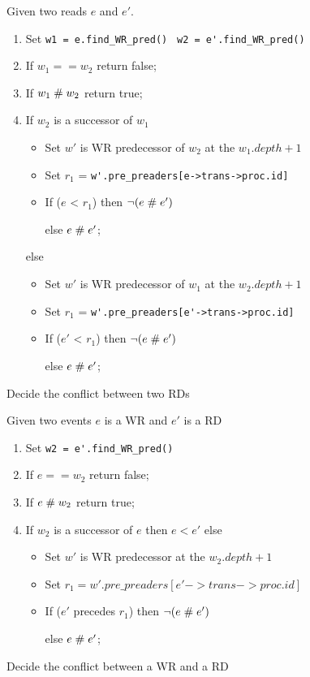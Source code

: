 \documentclass{llncs}
\begin{document}
\begin{algorithm}
Given two reads $e$ and $e'$.
\begin{enumerate}
	\item
		Set \verb!w1 = e.find_WR_pred() !
			\verb!w2 = e'.find_WR_pred()!
	\item
		If $w_1 == w_2$
			return false;
	\item
		If $w_1 \mathrel{\#} w_2$
			return true;
	\item
		If $w_2$ is a successor of $w_1$
		\begin{itemize}
			\item
				Set $w'$ is WR predecessor of $w_2$ at the $w_1.depth + 1$
			\item
				Set $r_1$ = \verb!w'.pre_preaders[e->trans->proc.id]!
			\item
				If ($e$ < $r_1$) then $\lnot (e \mathrel{\#} e')$
				
				else 	$e \mathrel{\#} e'$;
		\end{itemize}
		else
		\begin{itemize}
			\item
				Set $w'$ is WR predecessor of $w_1$ at the $w_2.depth + 1$
			\item
				Set $r_1$ = \verb!w'.pre_preaders[e'->trans->proc.id]!
			\item
				If ($e'$ < $r_1$) then $\lnot (e \mathrel{\#} e')$
				
				else 	$e \mathrel{\#} e'$;
		\end{itemize}
		
\end{enumerate}
\caption{Decide the conflict between two RDs}
\label{a:rds}	
\end{algorithm}

\begin{algorithm}
Given two events $e$ is a WR and $e'$ is a RD
\begin{enumerate}
	\item
		Set 	\verb!w2 = e'.find_WR_pred()!
	\item
		If $e == w_2$
			return false;
	\item
		If $e \mathrel{\#} w_2$
			return true;
	\item
		If $w_2$ is a successor of $e$
		then $e < e'$
		else
		\begin{itemize}
			\item
				Set $w'$ is WR predecessor at the $w_2.depth + 1$
			\item
				Set $r_1 = w'.pre\_preaders[e'->trans->proc.id]$
			\item
				If ($e'$ precedes $r_1$) then $\lnot (e \mathrel{\#} e')$
				
				else 	$e \mathrel{\#} e'$;
		\end{itemize}
		
\end{enumerate}
\caption{Decide the conflict between a WR and a RD}
\label{a:wrd}	
\end{algorithm}
\end{document}
